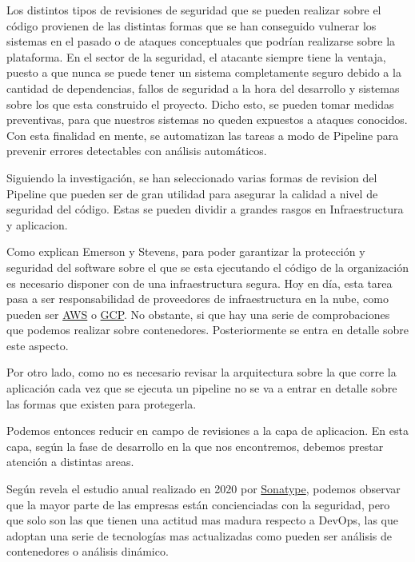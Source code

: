 \documentclass[12pt]{report} %
\begin{document}
Los distintos tipos de revisiones de seguridad que se pueden realizar sobre el
código provienen de las distintas formas que se han conseguido vulnerar los
sistemas en el pasado o de ataques conceptuales que podrían realizarse sobre la
plataforma.  En el sector de la seguridad, el atacante siempre tiene la ventaja,
puesto a que nunca se puede tener un sistema completamente seguro debido a la
cantidad de dependencias, fallos de seguridad a la hora del desarrollo y
sistemas sobre los que esta construido el proyecto.  Dicho esto, se pueden tomar
medidas preventivas, para que nuestros sistemas no queden expuestos a ataques
conocidos.  Con esta finalidad en mente, se automatizan las tareas a modo de
Pipeline para prevenir errores detectables con análisis automáticos.

Siguiendo la investigación, se han seleccionado varias formas de revision del
Pipeline que pueden ser de gran utilidad para asegurar la calidad a nivel de
seguridad del código.  Estas se pueden dividir a grandes rasgos en
Infraestructura y aplicacion.

Como explican Emerson y Stevens, para poder garantizar la protección y
seguridad del software sobre el que se esta ejecutando el código de la
organización es necesario disponer con de una infraestructura segura.  Hoy en
día, esta tarea pasa a ser responsabilidad de proveedores de infraestructura en
la nube, como pueden ser \href{https://aws.amazon.com/}{AWS} o
\href{https://console.cloud.google.com/}{GCP}.  No obstante, si que hay una
serie de comprobaciones que podemos realizar sobre contenedores.  Posteriormente
se entra en detalle sobre este aspecto.

Por otro lado, como no es necesario revisar la arquitectura sobre la que corre
la aplicación cada vez que se ejecuta un \Gls{pipeline} no se va a entrar en
detalle sobre las formas que existen para protegerla.

Podemos entonces reducir en campo de revisiones a la capa de aplicacion.  En
esta capa, según la fase de desarrollo en la que nos encontremos, debemos
prestar atención a distintas areas.

Según revela el estudio anual \nocite{sonatype2020} realizado en 2020 por
\href{https://sonatype.com}{Sonatype}, podemos observar que la mayor parte de
las empresas están concienciadas con la seguridad, pero que solo son las que
tienen una actitud mas madura respecto a DevOps, las que adoptan una serie de
tecnologías mas actualizadas como pueden ser análisis de contenedores o
análisis dinámico.
\end{document}
